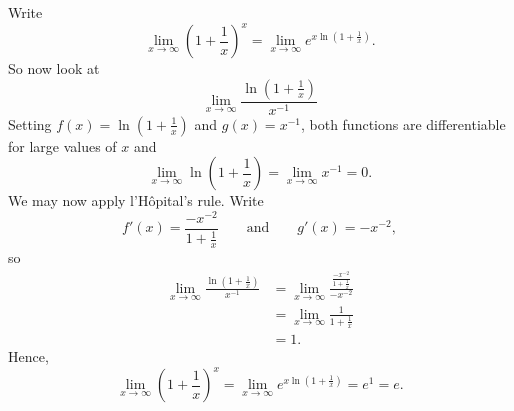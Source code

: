 \begin{solution}
Write
\[
\lim_{x\to \infty}\left(1 + \frac{1}{x}\right)^x = \lim_{x\to \infty}e^{x\ln\left(1 + \frac{1}{x}\right)}.
\]
So now look at
\[
\lim_{x\to\infty} \frac{\ln\left(1 + \frac{1}{x}\right)}{x^{-1}}
\]
Setting $f(x) = \ln\left(1 + \frac{1}{x}\right)$ and $g(x) = x^{-1}$,
both functions are differentiable for large values of $x$ and
\[
\lim_{x\to \infty}\ln\left(1 + \frac{1}{x}\right)=\lim_{x\to \infty}x^{-1} = 0.
\]
We may now apply l'H\^opital's rule. Write
\[
f'(x) = \frac{-x^{-2}}{1 + \frac{1}{x}}\qquad\text{and}\qquad g'(x) = -x^{-2},
\]
so
\begin{align*}
\lim_{x\to\infty} \frac{\ln\left(1 + \frac{1}{x}\right)}{x^{-1}} &= \lim_{x\to\infty} \frac{\frac{-x^{-2}}{1 + \frac{1}{x}}}{-x^{-2}} \\
&=\lim_{x\to\infty} \frac{1}{1 + \frac{1}{x}}\\
&=1.
\end{align*}
Hence, 
\[
\lim_{x\to \infty}\left(1 + \frac{1}{x}\right)^x = \lim_{x\to \infty}e^{x\ln\left(1 + \frac{1}{x}\right)} =e^{1} = e.
\]
\end{solution}











